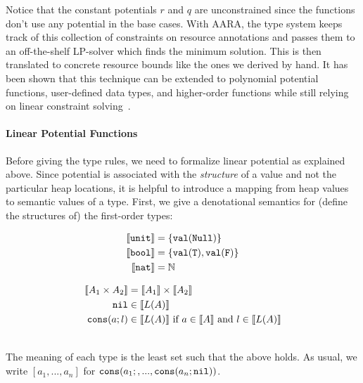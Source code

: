 \documentclass{easychair}
\newcommand{\irl}[1]{\mathtt{#1}}
\newcounter{rule}
\newcommand{\denote}[1]{\llbracket#1\rrbracket}
\newcommand{\val}[1]{\irl{val}(#1)}
\theoremstyle{definition}
\begin{document}
Notice that the constant potentials $r$ and $q$ are unconstrained since the 
functions don't use any potential in the base cases.
With AARA, the type system keeps track of this collection of constraints on
resource annotations and passes them to an off-the-shelf LP-solver 
which finds the minimum solution. This is then translated to concrete resource bounds
like the ones we derived by hand. It has been shown that this technique can be extended
to polynomial potential functions, user-defined data types, and higher-order functions while
still relying on linear constraint solving~\cite{HoffmannAH10,HoffmannW15}.
%

\paragraph{Linear Potential Functions}\label{sect:lfp}
Before giving the type rules, we need to formalize linear potential as explained above.
Since potential is associated with the \emph{structure} of a value and not the particular heap 
locations, it is helpful to introduce a mapping from
heap values to semantic values of a type. 
First, we give a denotational semantics for (define the structures of) the first-order types:
\hspace{-1em}
  \begin{minipage}{0.6\linewidth}
\begin{align*}
	\denote{\unittyabt} &= \{\val{\irl{Null}}\}\\
	\denote{\booltyabt} &= \{\val{\irl{T}}, \val{\irl{F}}\}\\
	\denote{\irl{nat}} &= \mathbb{N}\\
\end{align*}
\end{minipage}%
\begin{minipage}{1\linewidth}
\begin{align*}
\denote{\prodtycst{A_1}{A_2}} &= \denote{A_1} \times \denote{A_2}\\
\nilexcst &\in \denote{L(A)}\\
\consexcst{a}{l} &\in \denote{L(A)} \text{ if } a \in \denote{A} \text{ and } l \in \denote{L(A)}\\
\end{align*}
  \end{minipage}\\
The meaning of each type is the least set such that the above holds. As usual, we write $[a_1,...,a_n]$ for ${\mathtt{cons}}\mathtt{(}{a_1;,...,{\mathtt{cons}}\mathtt{(}{a_n;\mathtt{nil}}\mathtt{)}}\mathtt{)}$.
\end{document}
